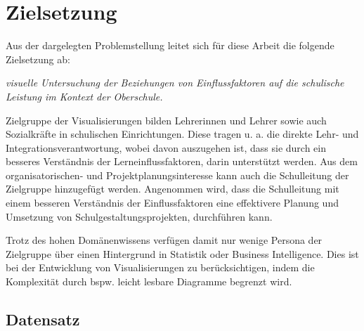 \chapter[Zielsetzung]{Zielsetzung}

Aus der dargelegten Problemstellung leitet sich für diese Arbeit die folgende Zielsetzung ab:

\begin{center}
    \textit{visuelle Untersuchung der Beziehungen von Einflussfaktoren auf die schulische Leistung im Kontext der Oberschule.}
\end{center}    

Zielgruppe der Visualisierungen bilden Lehrerinnen und Lehrer sowie auch Sozialkräfte in schulischen Einrichtungen. 
Diese tragen u. a. die direkte Lehr- und Integrationsverantwortung, wobei davon auszugehen ist, dass sie durch ein besseres Verständnis der Lerneinflussfaktoren, darin unterstützt werden.
Aus dem organisatorischen- und Projektplanungsinteresse kann auch die Schulleitung der Zielgruppe hinzugefügt werden.
Angenommen wird, dass die Schulleitung mit einem besseren Verständnis der Einflussfaktoren eine effektivere Planung und Umsetzung von Schulgestaltungsprojekten, durchführen kann.

Trotz des hohen Domänenwissens verfügen damit nur wenige Persona der Zielgruppe über einen Hintergrund in Statistik oder Business Intelligence.
Dies ist bei der Entwicklung von Visualisierungen zu berücksichtigen, indem die Komplexität durch bspw. leicht lesbare Diagramme begrenzt wird.


\section[Untersuchter Datensatz]{Datensatz}

